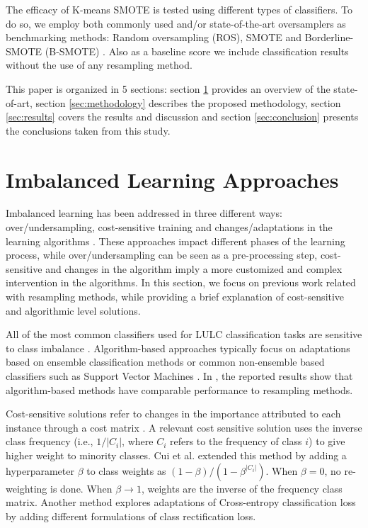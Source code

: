 \documentclass[authoryear,preprint,12pt]{elsarticle}
\begin{document}
\begin{linenumbers}
The efficacy of K-means SMOTE is tested using different
types of classifiers. To do so, we employ both commonly used and/or
state-of-the-art oversamplers as benchmarking methods: Random oversampling
(ROS), SMOTE and Borderline-SMOTE (B-SMOTE) \citep{Han2005}. Also
as a baseline score we include classification results without the use of any
resampling method.

This paper is organized in 5 sections: section \ref{sec:sota} provides an
overview of the state-of-art, section \ref{sec:methodology} describes the
proposed methodology, section \ref{sec:results} covers the results and
discussion and section \ref{sec:conclusion} presents the conclusions taken from
this study.

\section{Imbalanced Learning Approaches} \label{sec:sota}

Imbalanced learning has been addressed in three different ways:
over/undersampling, cost-sensitive training and changes/adaptations in the
learning algorithms \citep{Kaur2019}. These approaches impact different
phases of the learning process, while over/undersampling can be seen as a
pre-processing step, cost-sensitive and changes in the algorithm imply a more
customized and complex intervention in the algorithms. In this
section, we focus on previous work related with resampling methods, while
providing a brief explanation of cost-sensitive and algorithmic level solutions.

All of the most common classifiers used for LULC classification tasks
\citep{Khatami2016, Gavade2019} are sensitive to class imbalance
\citep{Blagus2010}. Algorithm-based approaches typically focus on adaptations
based on ensemble classification methods \citep{Mellor2015} or common
non-ensemble based classifiers such as Support Vector Machines \citep{Shao2014}.
In \citep{Lee2016}, the reported results show that algorithm-based methods have
comparable performance to resampling methods.

Cost-sensitive solutions refer to changes in the importance attributed to each
instance through a cost matrix \citep{Huang2016,Cui2019,Dong2017}. A
relevant cost sensitive solution
\citep{Huang2016} uses  the inverse class frequency (i.e., $1/|C_i|$, where $C_i$ refers
to the frequency of class $i$) to give higher weight to
minority classes. Cui et al. \citep{Cui2019} extended this method by adding a
hyperparameter $\beta$ to class weights as $(1-\beta)/(1-\beta^{|C_i|})$. When
$\beta=0$, no re-weighting is done. When $\beta\rightarrow 1$, weights are the
inverse of the frequency class matrix. Another method \citep{Dong2017} explores
adaptations of Cross-entropy classification loss by adding different
formulations of class rectification loss.


\end{linenumbers}
\end{document}
